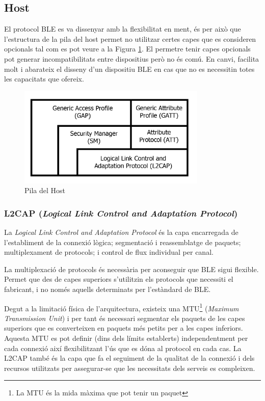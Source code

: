 \subsection{Host}
El protocol BLE es va dissenyar amb la flexibilitat en ment, és per això que l'estructura de la pila del host permet no utilitzar certes capes que es consideren opcionals tal com es pot veure a la Figura \ref{host_stack}.
El permetre tenir capes opcionals pot generar incompatibilitats entre dispositius però no és comú.
En canvi, facilita molt i abarateix el disseny d'un dispositiu BLE en cas que no es necessitin totes les capacitats que ofereix.

\begin{figure}[h!]
	\begin{center}
		\includegraphics[width=0.8\textwidth]{./images/ble_host_stack.png}
		\caption{Pila del Host \cite{ble_stack}}
			\label{host_stack}
	\end{center}
\end{figure}

\subsubsection{L2CAP (\textit{Logical Link Control and Adaptation Protocol})}
La \textit{Logical Link Control and Adaptation Protocol} és la capa encarregada de l'establiment de la connexió lògica; segmentació i reassemblatge de paquets; multiplexament de protocols;  i control de flux individual per canal.

La multiplexació de protocols és necessària per aconseguir que BLE sigui flexible.
Permet que des de capes superiors s'utilitzin els protocols que necessiti el fabricant, i no només aquells determinats per l'estàndard de BLE.

Degut a la limitació física de l'arquitectura, existeix una MTU\footnote{La MTU és la mida màxima que pot tenir un paquet} (\textit{Maximum Transmission Unit}) i per tant és necessari segmentar els paquets de les capes superiors que es converteixen en paquets més petits per a les capes inferiors.
Aquesta MTU es pot definir (dins dels límits establerts) independentment per cada connexió així flexibilitzant l'ús que es dóna al protocol en cada cas.
La L2CAP també és la capa que fa el seguiment de la qualitat de la connexió i dels recursos utilitzats per assegurar-se que les necessitats dels serveis es compleixen.

